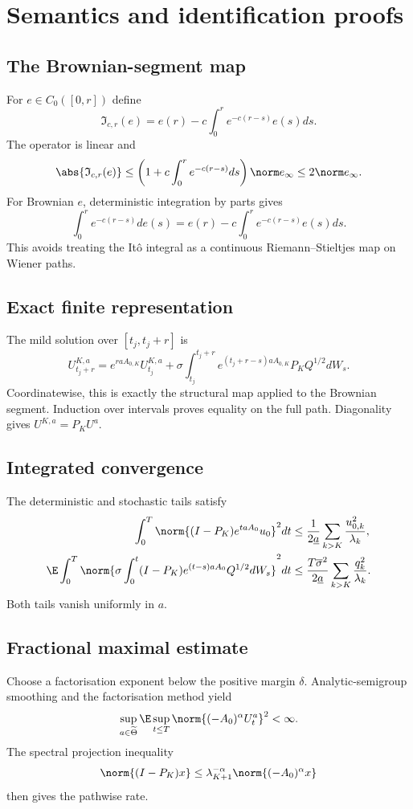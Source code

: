 \section{Semantics and identification proofs}

\subsection{The Brownian-segment map}
For $e\in C_0([0,r])$ define
\[
 \mathfrak I_{c,r}(e)=e(r)-c\int_0^re^{-c(r-s)}e(s)ds.
\]
The operator is linear and
\[
 \abs{\mathfrak I_{c,r}(e)}
 \le\left(1+c\int_0^re^{-c(r-s)}ds\right)\norm e_\infty
 \le2\norm e_\infty.
\]
For Brownian $e$, deterministic integration by parts gives
\[
 \int_0^re^{-c(r-s)}de(s)
 =e(r)-c\int_0^re^{-c(r-s)}e(s)ds.
\]
This avoids treating the It\^o integral as a continuous Riemann--Stieltjes map on Wiener paths.

\subsection{Exact finite representation}
The mild solution over $[t_j,t_j+r]$ is
\[
 U_{t_j+r}^{K,a}=e^{raA_{0,K}}U_{t_j}^{K,a}
 +\sigma\int_{t_j}^{t_j+r}e^{(t_j+r-s)aA_{0,K}}P_KQ^{1/2}dW_s.
\]
Coordinatewise, this is exactly the structural map applied to the Brownian segment. Induction over intervals proves equality on the full path. Diagonality gives $U^{K,a}=P_KU^a$.

\subsection{Integrated convergence}
The deterministic and stochastic tails satisfy
\begin{align*}
 \int_0^T\norm{(I-P_K)e^{taA_0}u_0}^2dt
 &\le\frac1{2\underline a}\sum_{k>K}\frac{u_{0,k}^2}{\lambda_k},\\
 \E\int_0^T\norm{\sigma\int_0^t(I-P_K)e^{(t-s)aA_0}Q^{1/2}dW_s}^2dt
 &\le\frac{T\overline\sigma^2}{2\underline a}\sum_{k>K}\frac{q_k^2}{\lambda_k}.
\end{align*}
Both tails vanish uniformly in $a$.

\subsection{Fractional maximal estimate}
Choose a factorisation exponent below the positive margin $\delta$. Analytic-semigroup smoothing and the factorisation method yield
\[
 \sup_{a\in\widetilde\Theta}\E\sup_{t\le T}
 \norm{(-A_0)^\alpha U_t^a}^2<\infty.
\]
The spectral projection inequality
\[
 \norm{(I-P_K)x}\le\lambda_{K+1}^{-\alpha}\norm{(-A_0)^\alpha x}
\]
then gives the pathwise rate.

